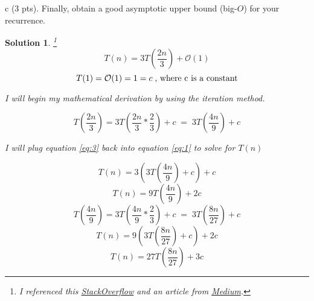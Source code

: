\documentclass[11pt]{article}
\newtheorem*{solution}{Solution}
\begin{document}
\begin{enumerate}
c (3 pts). Finally, obtain a good asymptotic upper bound (big-$O$) for your recurrence.  
\begin{solution} \footnote{I referenced this \href{https://stackoverflow.com/questions/30201391/how-to-write-a-recurrence-relation-for-a-given-piece-of-code}{StackOverflow} and an article from \href{https://medium.com/@randerson112358/recurrence-relation-475d4a4eaed1}{Medium}.}
	\begin{equation} \label{eq:1}
		T(n) = 3T(\frac{2n}{3}) + \mathcal{O}(1)
	\end{equation}
	\begin{equation} \label{eq:2}
		T(1) = \mathcal{O}(1) = 1 = c \textnormal{\;, where c is a constant}
	\end{equation}
	\begin{center}
		I will begin my mathematical derivation by using the iteration method.
	\end{center}
	\begin{equation} \label{eq:3}
		T(\frac{2n}{3}) = 3T(\frac{2n}{3} * \frac{2}{3}) + c\; =\; 3T(\frac{4n}{9}) + c
	\end{equation}
	\begin{center}
		I will plug equation \ref{eq:3} back into equation \ref{eq:1} to solve for $T(n)$
	\end{center}
	\begin{equation}\label{eq:4}
		T(n) = 3(3T(\frac{4n}{9}) + c) + c
	\end{equation}
	\begin{equation}\label{eq:5}
		T(n) = 9T(\frac{4n}{9}) + 2c
	\end{equation}
	\begin{equation}\label{eq:6}
		T(\frac{4n}{9}) = 3T(\frac{4n}{9} * \frac{2}{3}) + c \; = \; 3T(\frac{8n}{27}) + c 
	\end{equation}
	\begin{equation}\label{eq:7}
		T(n) = 9(3T(\frac{8n}{27}) + c ) + 2c
	\end{equation}
	\begin{equation}\label{eq:8}
		T(n) = 27T(\frac{8n}{27}) + 3c
	\end{equation}

\end{solution}
\end{enumerate}
\end{document}
